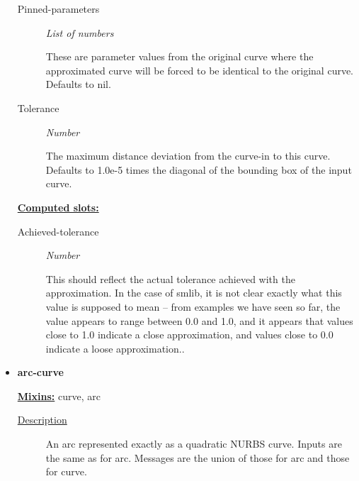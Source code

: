 \documentclass [11pt]{book}
\begin{document}
\begin{itemize}
\begin{description}
\item [Pinned-parameters]
\emph{List of numbers}

 These are parameter values from the original curve
where the approximated curve will be forced to be identical to the original
curve. Defaults to nil.




\item [Tolerance]
\emph{Number}

 The maximum distance deviation from the curve-in to this curve.
Defaults to 1.0e-5 times the diagonal of the bounding box of the input curve.




\end{description}






\textbf{
\underline{Computed slots:}}

\begin{description}

\item [Achieved-tolerance]
\emph{Number}

 This should reflect the actual tolerance achieved with the approximation.
In the case of smlib, it is not clear exactly what this value is supposed to mean --
from examples we have seen so far, the value appears to range between 0.0 and 1.0, and
it appears that values close to 1.0 indicate a close approximation, and values
close to 0.0 indicate a loose approximation..




\end{description}







\item {}
\label{prim:arc-curve}
\textbf{arc-curve}


\textbf{
\underline{Mixins:}} curve, arc





\begin{description}

\item [
\underline{Description}]


An arc represented exactly as a quadratic NURBS curve. Inputs are the same as for arc. 
Messages are the union of those for arc and those for curve.




\end{description}
\end{itemize}
\end{document}
